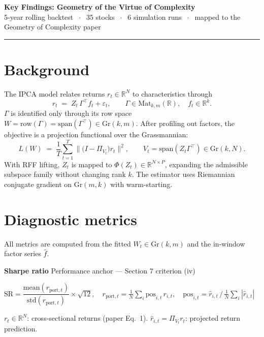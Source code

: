 \documentclass[11pt,a4paper]{article}
\begin{document}

\begin{center}
  {\LARGE\bfseries Key Findings: Geometry of the Virtue of Complexity}\\[6pt]
  {\normalsize 5-year rolling backtest $\;\cdot\;$ 35 stocks $\;\cdot\;$ 6 simulation runs
  $\;\cdot\;$ mapped to the Geometry of Complexity paper}
\end{center}
\noindent\rule{\textwidth}{0.4pt}

\section*{Background}

The IPCA model relates returns $r_t \in \mathbb{R}^N$ to characteristics through
\[
  r_t \;=\; Z_t\,\Gamma^\top f_t + \varepsilon_t,
  \qquad \Gamma \in \mathrm{Mat}_{k,m}(\mathbb{R}),\quad f_t \in \mathbb{R}^k.
\]
$\Gamma$ is identified only through its row space
$W = \mathrm{row}(\Gamma) = \mathrm{span}(\Gamma^\top) \in \mathrm{Gr}(k,m)$.
After profiling out factors, the objective is a projection functional over the Grassmannian:
\[
  L(W) \;=\; \frac{1}{T}\sum_{t=1}^T \bigl\|\bigl(I - \Pi_{V_t}\bigr)r_t\bigr\|^2,
  \qquad V_t = \mathrm{span}(Z_t\Gamma^\top) \in \mathrm{Gr}(k,N).
\]
With RFF lifting, $Z_t$ is mapped to $\Phi(Z_t)\in\mathbb{R}^{N\times P}$, expanding
the admissible subspace family without changing rank $k$.
The estimator uses Riemannian conjugate gradient on $\mathrm{Gr}(m,k)$ with warm-starting.

\section*{Diagnostic metrics}

All metrics are computed from the fitted $W_t \in \mathrm{Gr}(k,m)$ and the
in-window factor series $\hat{f}$.

\medskip
\textbf{Sharpe ratio} \hfill{\small Performance anchor — Section 7 criterion (iv)}
\begin{formulabox}
$\mathrm{SR} = \dfrac{\mathrm{mean}(r_{\mathrm{port},t})}{\mathrm{std}(r_{\mathrm{port},t})}
\times \sqrt{12}, \quad
r_{\mathrm{port},t} = \tfrac{1}{N}\sum_i \mathrm{pos}_{i,t}\,r_{i,t},\quad
\mathrm{pos}_{i,t} = \hat{r}_{i,t}\,/\,\tfrac{1}{N}\sum_i|\hat{r}_{i,t}|$
\end{formulabox}
{\small\color{cgray} $r_t\in\mathbb{R}^N$: cross-sectional returns (paper Eq.~1).
$\hat{r}_{i,t} = \Pi_{V_t}r_t$: projected return prediction.}
\end{document}
